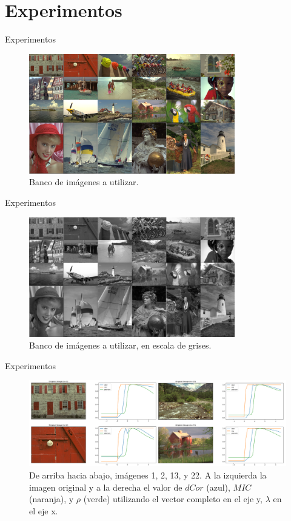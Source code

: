 \documentclass{beamer}
\begin{document}
\section{Experimentos}
\begin{frame}{Experimentos}
    \begin{figure}[H]
        \centering
        \includegraphics[width=0.8\textwidth]{all_images_grid.png}
        \caption{Banco de im\'agenes a utilizar.}
    \end{figure}        
\end{frame}

\begin{frame}{Experimentos}
    \begin{figure}[H]
        \centering
        \includegraphics[width=0.8\textwidth]{all_images_grid_bw.png}
        \caption{Banco de im\'agenes a utilizar, en escala de grises.}
    \end{figure}     
\end{frame}

\begin{frame}{Experimentos}
    \begin{figure}[H]
        \centering
        \includegraphics[width=\textwidth]{lam_v_com_all_img.png}
        \caption{De arriba hacia abajo, im\'agenes 1, 2, 13, y 22. A la izquierda la imagen original y a la derecha el valor de $dCor$ (azul), $MIC$ (naranja), y $\rho$ (verde) utilizando el vector completo en el eje y, $\lambda$ en el eje x.}
    \end{figure}
\end{frame}
\end{document}
